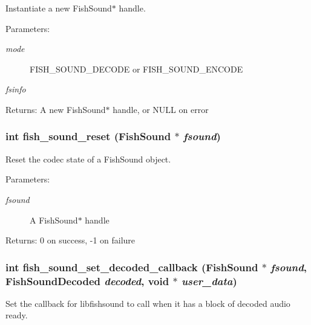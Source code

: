 Instantiate a new Fish\-Sound$\ast$ handle. 

\begin{Desc}
\item[Parameters:]
\begin{description}
\item[{\em mode}]FISH\_\-SOUND\_\-DECODE or FISH\_\-SOUND\_\-ENCODE \item[{\em fsinfo}]\end{description}
\end{Desc}
\begin{Desc}
\item[Returns:]A new Fish\-Sound$\ast$ handle, or NULL on error \end{Desc}
\subsubsection{\setlength{\rightskip}{0pt plus 5cm}int fish\_\-sound\_\-reset ({\bf Fish\-Sound} $\ast$ {\em fsound})}\label{fishsound_8h_a9}


Reset the codec state of a Fish\-Sound object. 

\begin{Desc}
\item[Parameters:]
\begin{description}
\item[{\em fsound}]A Fish\-Sound$\ast$ handle \end{description}
\end{Desc}
\begin{Desc}
\item[Returns:]0 on success, -1 on failure \end{Desc}
\subsubsection{\setlength{\rightskip}{0pt plus 5cm}int fish\_\-sound\_\-set\_\-decoded\_\-callback ({\bf Fish\-Sound} $\ast$ {\em fsound}, {\bf Fish\-Sound\-Decoded} {\em decoded}, void $\ast$ {\em user\_\-data})}\label{fishsound_8h_a5}


Set the callback for libfishsound to call when it has a block of decoded audio ready. 


